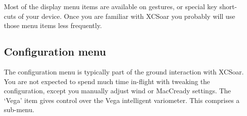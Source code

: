 Most of the display menu items are available on gestures, or special key 
short-cuts of your device. Once you are familiar with XCSoar you probably 
will use those menu items less frequently.

\subsection*{Configuration menu}
\noindent{}

The configuration menu is typically part of the ground interaction with 
XCSoar. You are not expected to spend much time in-flight with tweaking 
the configuration, except you manually adjust wind or MacCready settings. 
The `Vega' item gives control over the  Vega intelligent variometer. This 
comprises a sub-menu.


